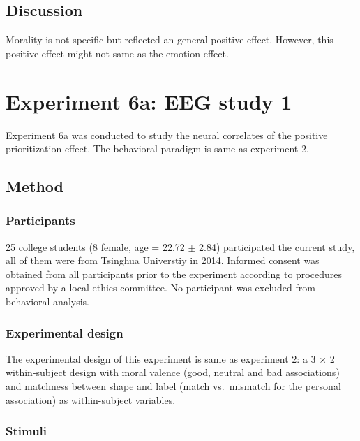 \documentclass[man]{apa6}
\begin{document}
\hypertarget{discussion-5}{%
\subsection{Discussion}\label{discussion-5}}

Morality is not specific but reflected an general positive effect. However, this positive effect might not same as the emotion effect.

\hypertarget{experiment-6a-eeg-study-1}{%
\section{Experiment 6a: EEG study 1}\label{experiment-6a-eeg-study-1}}

Experiment 6a was conducted to study the neural correlates of the positive prioritization effect. The behavioral paradigm is same as experiment 2.

\hypertarget{method-7}{%
\subsection{Method}\label{method-7}}

\hypertarget{participants-9}{%
\subsubsection{Participants}\label{participants-9}}

25 college students (8 female, age = 22.72 \(\pm\) 2.84) participated the current study, all of them were from Tsinghua Universtiy in 2014. Informed consent was obtained from all participants prior to the experiment according to procedures approved by a local ethics committee. No participant was excluded from behavioral analysis.

\hypertarget{experimental-design-3}{%
\subsubsection{Experimental design}\label{experimental-design-3}}

The experimental design of this experiment is same as experiment 2: a 3 × 2 within-subject design with moral valence (good, neutral and bad associations) and matchness between shape and label (match vs.~mismatch for the personal association) as within-subject variables.

\hypertarget{stimuli-4}{%
\subsubsection{Stimuli}\label{stimuli-4}}
\end{document}
